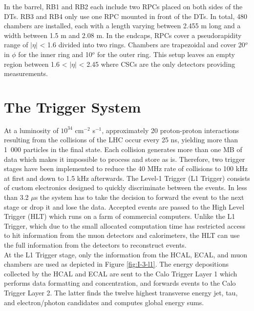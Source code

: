       In the barrel, RB1 and RB2 each include two RPCs placed on both sides of the DTs. RB3 and RB4 only use one RPC mounted in front of the DTs. In total, 480 chambers are installed, each with a length varying between 2.455 m long and a width between 1.5 m and 2.08 m. In the endcaps, RPCs cover a pseudorapidity range of $ | \eta | $ < 1.6 divided into two rings. Chambers are trapezoidal and cover 20$^o$ in $ \phi $ for the inner ring and 10$^o$ for the outer ring. This setup leaves an empty region between 1.6 < $ | \eta | $ < 2.45 where CSCs are the only detectors providing measurements.

  \section{The Trigger System}

    At a luminosity of $ 10^{34} $ cm$^{-2}$ s$^{-1}$, approximately 20 proton-proton interactions resulting from the collisions of the LHC occur every 25 ns, yielding more than \mbox{1 000} particles in the final state. Each collision generates more than one MB of data which makes it impossible to process and store as is. Therefore, two trigger stages have been implemented to reduce the 40 MHz rate of collisions to 100 kHz at first and down to 1.5 kHz afterwards. The Level-1 Trigger (L1 Trigger) consists of custom electronics designed to quickly discriminate between the events. In less than 3.2 $\mu$s the system has to take the decision to forward the event to the next stage or drop it and lose the data. Accepted events are passed to the High Level Trigger (HLT) which runs on a farm of commercial computers. Unlike the L1 Trigger, which due to the small allocated computation time has restricted access to hit information from the muon detectors and calorimeters, the HLT can use the full information from the detectors to reconstruct events. \\

    At the L1 Trigger stage, only the information from the HCAL, ECAL, and muon chambers are used as depicted in Figure \ref{fig:I-3-l1}. The energy depositions collected by the HCAL and ECAL are sent to the Calo Trigger Layer 1 which performs data formatting and concentration, and forwards events to the Calo Trigger Layer 2. The latter finds the twelve highest transverse energy jet, tau, and electron/photon candidates and computes global energy sums. \\

